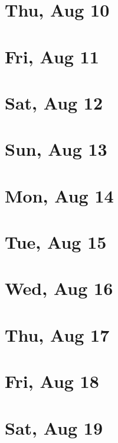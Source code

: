	\section{Thu, Aug 10}
		
		
	\section{Fri, Aug 11}
		
		
	\section{Sat, Aug 12}
		
		
	\section{Sun, Aug 13}
		
		
	\section{Mon, Aug 14}
		
		
	\section{Tue, Aug 15}
		
		
	\section{Wed, Aug 16}
		
		
	\section{Thu, Aug 17}
		
		
	\section{Fri, Aug 18}
		
		
	\section{Sat, Aug 19}
		
		

